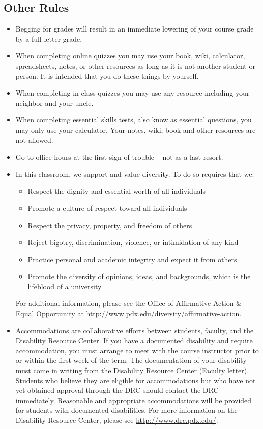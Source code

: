 \documentclass[letterpaper,10pt]{article}
\begin{document}
\subsection{Other Rules}
\begin{itemize}


\item Begging for grades will result in an immediate lowering of your
  course grade by a full letter grade.
  
  \item When completing online quizzes you may use your book, wiki, calculator, spreadsheets, notes, or other resources as long as it is not another student or person.  It is intended that you do these things by yourself.
  
  \item  When completing in-class quizzes you may use any resource including your neighbor and your uncle.
  
  \item When completing essential skills tests, also know as essential questions, you may only use your calculator.  Your notes, wiki, book and other resources are not allowed.

\item Go to office hours at the first sign of trouble -- not as a last
  resort.

\item In this classroom, we support and value diversity.  To do so requires that we:
\begin{itemize}
   \item Respect the dignity and essential worth of all individuals
   \item Promote a culture of respect toward all individuals
    \item Respect the privacy, property, and freedom of others
    \item Reject bigotry, discrimination, violence, or intimidation of any kind
    \item Practice personal and academic integrity and expect it from others
   \item Promote the diversity of opinions, ideas, and backgrounds, which is
    the lifeblood of a university
\end{itemize}

 For additional information, please see the Office of Affirmative Action \& Equal Opportunity at \url{http://www.pdx.edu/diversity/affirmative-action}.


\item Accommodations are collaborative efforts between students, faculty, and the Disability Resource Center.  If you have a documented disability and require accommodation, you must arrange to meet with the course instructor prior to or within the first week of the term.  The documentation of your disability must come in writing from the Disability Resource Center (Faculty letter).  Students who believe they are eligible for accommodations but who have not yet obtained approval through the DRC should contact the DRC immediately.  Reasonable and appropriate accommodations will be provided for students with documented disabilities.  For more information on the Disability Resource Center, please see \url{http://www.drc.pdx.edu/}. 


\end{itemize}
\end{document}
